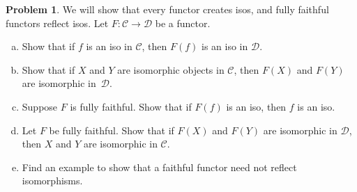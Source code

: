 \documentclass[11pt]{article}
\theoremstyle{definition}
\newtheorem{problem}{Problem}
\begin{document}
\begin{problem}
We will show that every functor creates isos, and fully faithful functors reflect isos. Let $F\!: \mathscr{C} \to \mathscr{D}$ be a functor.
\begin{enumerate}[a)]
	\item Show that if $f$ is an iso in $\mathscr{C}$, then $F(f)$ is an iso in $\mathscr{D}$.
	\item Show that if $X$ and $Y$ are isomorphic objects in $\mathscr{C}$, then $F(X)$ and $F(Y)$ are isomorphic in~$\mathscr{D}$.
	\item Suppose $F$ is fully faithful. Show that if $F(f)$ is an iso, then $f$ is an iso.
	\item Let $F$ be fully faithful. Show that if $F(X)$ and $F(Y)$ are isomorphic in $\mathscr{D}$, then $X$ and $Y$ are isomorphic in $\mathscr{C}$.
	\item Find an example to show that a faithful functor need not reflect isomorphisms.
\end{enumerate}
\end{problem}

\vfill
\end{document}
